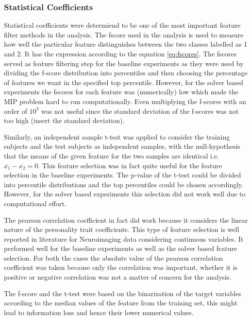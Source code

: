 \documentclass[msthesis.tex]{subfiles}
\begin{document}
\subsubsection{Statistical Coefficients}

Statistical coefficients were determiend to be one of the most important feature filter methods in the analysis.
The fscore used in the analysis is used to measure how well the particular feature distinguishes between the two classes labelled as 1 and 2. It has the expression according to the equation \ref{eq:fscores}. The fscores served as feature filtering step for the baseline experiments as they were used by dividing the f-score distribution into percentiles and then choosing the percentage of features we want in the specified top percentile. However, for the solver based experiments the fscores for each feature was (numerically) low which made the MIP problem hard to run computationally. Even multiplying the f-scores with an order of $10^3$ was not useful since the standard deviation of the f-scores was not too high (insert the standard deviation). 

Similarly, an independent sample t-test was applied to consider the training subjects and the test subjects as independent samples, with the null-hypothesis that the means of the given feature for the two samples are identical i.e. $\overline{x_{1}} - \overline{x_{2}} = 0$. This feature selection was in fact quite useful for the feature selection in the baseline experiments. The p-value of the t-test could be divided into percentile distributions and the top percentiles could be chosen accordingly. However, for the solver based experiments this selection did not work well due to computational effort. 

The pearson correlation coefficient in fact did work because it considers the linear nature of the personality trait coefficients. This type of feature selection is well reported in literature for Neuroimaging data considering continuous variables. It performed well for the baseline experiments as well as the solver based feature selection. For both the cases the absolute value of the pearson correlation coefficient was taken because only the correlation was important, whether it is positive or negative correlation was not a matter of concern for the analysis.

The f-score and the t-test were based on the binarization of the target variables according to the median values of the feature from the training set, this might lead to information loss and hence their lower numerical values. 
\end{document}
